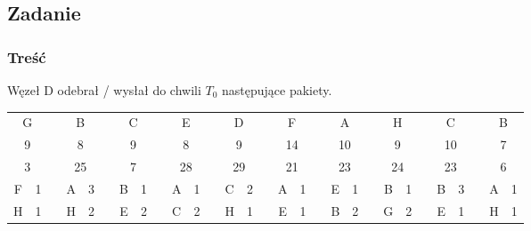 	\subsection{Zadanie}
		\subsubsection{Treść}
			Węzeł D odebrał / wysłał do chwili $ T_0 $ następujące pakiety.\\
			\begin{tabular}{|c|c|c|c|c|c|c|c|c|c|c|c|c|c|c|c|c|c|c|c|c|c|c|c|c|c|c|c|c|}
				\cline{1-2} \cline{4-5} \cline{7-8} \cline{10-11} \cline{13-14} \cline{16-17} \cline{19-20} \cline{22-23} \cline{25-26} \cline{28-29}
				\multicolumn{2}{|c|}{G} &  & \multicolumn{2}{c|}{B}  &  & \multicolumn{2}{c|}{C} &  & \multicolumn{2}{c|}{E}  &  & \multicolumn{2}{c|}{D}  &  & \multicolumn{2}{c|}{F}  &  & \multicolumn{2}{c|}{A}  &  & \multicolumn{2}{c|}{H}  &  & \multicolumn{2}{c|}{C}  &  & \multicolumn{2}{c|}{B} \\ \cline{1-2} \cline{4-5} \cline{7-8} \cline{10-11} \cline{13-14} \cline{16-17} \cline{19-20} \cline{22-23} \cline{25-26} \cline{28-29} 
				\multicolumn{2}{|c|}{9} &  & \multicolumn{2}{c|}{8}  &  & \multicolumn{2}{c|}{9} &  & \multicolumn{2}{c|}{8}  &  & \multicolumn{2}{c|}{9}  &  & \multicolumn{2}{c|}{14} &  & \multicolumn{2}{c|}{10} &  & \multicolumn{2}{c|}{9}  &  & \multicolumn{2}{c|}{10} &  & \multicolumn{2}{c|}{7} \\ \cline{1-2} \cline{4-5} \cline{7-8} \cline{10-11} \cline{13-14} \cline{16-17} \cline{19-20} \cline{22-23} \cline{25-26} \cline{28-29} 
				\multicolumn{2}{|c|}{3} &  & \multicolumn{2}{c|}{25} &  & \multicolumn{2}{c|}{7} &  & \multicolumn{2}{c|}{28} &  & \multicolumn{2}{c|}{29} &  & \multicolumn{2}{c|}{21} &  & \multicolumn{2}{c|}{23} &  & \multicolumn{2}{c|}{24} &  & \multicolumn{2}{c|}{23} &  & \multicolumn{2}{c|}{6} \\ \cline{1-2} \cline{4-5} \cline{7-8} \cline{10-11} \cline{13-14} \cline{16-17} \cline{19-20} \cline{22-23} \cline{25-26} \cline{28-29} 
				F          & 1          &  & A           & 3         &  & B          & 1         &  & A           & 1         &  & C           & 2         &  & A           & 1         &  & E           & 1         &  & B           & 1         &  & B           & 3         &  & A          & 1         \\ \cline{1-2} \cline{4-5} \cline{7-8} \cline{10-11} \cline{13-14} \cline{16-17} \cline{19-20} \cline{22-23} \cline{25-26} \cline{28-29} 
				H          & 1          &  & H           & 2         &  & E          & 2         &  & C           & 2         &  & H           & 1         &  & E           & 1         &  & B           & 2         &  & G           & 2         &  & E           & 1         &  & H          & 1         \\ \cline{1-2} \cline{4-5} \cline{7-8} \cline{10-11} \cline{13-14} \cline{16-17} \cline{19-20} \cline{22-23} \cline{25-26} \cline{28-29} 

\end{tabular}
